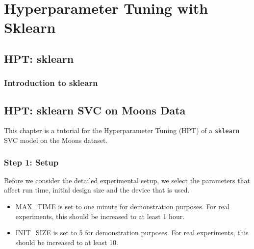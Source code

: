 \documentclass[
  letterpaper,
  DIV=11,
  numbers=noendperiod]{scrreprt}
\providecommand{\tightlist}{%
  \setlength{\itemsep}{0pt}\setlength{\parskip}{0pt}}\usepackage{longtable,booktabs,array}
\begin{document}
\part{Hyperparameter Tuning with Sklearn}

\hypertarget{sec-hpt-sklearn}{%
\chapter{HPT: sklearn}\label{sec-hpt-sklearn}}

\hypertarget{sec-hpt-sklearn-intro}{%
\section{Introduction to sklearn}\label{sec-hpt-sklearn-intro}}

\hypertarget{sec-hpt-sklearn-svc}{%
\chapter{HPT: sklearn SVC on Moons Data}\label{sec-hpt-sklearn-svc}}

This chapter is a tutorial for the Hyperparameter Tuning (HPT) of a
\texttt{sklearn} SVC model on the Moons dataset.

\hypertarget{sec-setup-10}{%
\section{Step 1: Setup}\label{sec-setup-10}}

Before we consider the detailed experimental setup, we select the
parameters that affect run time, initial design size and the device that
is used.

\begin{tcolorbox}[enhanced jigsaw, rightrule=.15mm, opacityback=0, colframe=quarto-callout-caution-color-frame, opacitybacktitle=0.6, toptitle=1mm, arc=.35mm, colbacktitle=quarto-callout-caution-color!10!white, coltitle=black, toprule=.15mm, leftrule=.75mm, titlerule=0mm, title=\textcolor{quarto-callout-caution-color}{\faFire}\hspace{0.5em}{Caution: Run time and initial design size should be increased for real
experiments}, bottomrule=.15mm, breakable, bottomtitle=1mm, left=2mm, colback=white]

\begin{itemize}
\tightlist
\item
  MAX\_TIME is set to one minute for demonstration purposes. For real
  experiments, this should be increased to at least 1 hour.
\item
  INIT\_SIZE is set to 5 for demonstration purposes. For real
  experiments, this should be increased to at least 10.
\end{itemize}

\end{tcolorbox}
\end{document}
